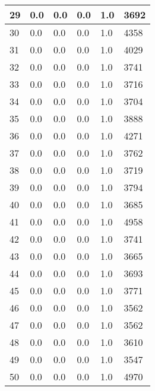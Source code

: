 \begin{longtable}{|l|l|l|l|l|l|}
29 & 0.0 & 0.0 & 0.0 & 1.0 & 3692 \\ \hline 
30 & 0.0 & 0.0 & 0.0 & 1.0 & 4358 \\ \hline 
31 & 0.0 & 0.0 & 0.0 & 1.0 & 4029 \\ \hline 
32 & 0.0 & 0.0 & 0.0 & 1.0 & 3741 \\ \hline 
33 & 0.0 & 0.0 & 0.0 & 1.0 & 3716 \\ \hline 
34 & 0.0 & 0.0 & 0.0 & 1.0 & 3704 \\ \hline 
35 & 0.0 & 0.0 & 0.0 & 1.0 & 3888 \\ \hline 
36 & 0.0 & 0.0 & 0.0 & 1.0 & 4271 \\ \hline 
37 & 0.0 & 0.0 & 0.0 & 1.0 & 3762 \\ \hline 
38 & 0.0 & 0.0 & 0.0 & 1.0 & 3719 \\ \hline 
39 & 0.0 & 0.0 & 0.0 & 1.0 & 3794 \\ \hline 
40 & 0.0 & 0.0 & 0.0 & 1.0 & 3685 \\ \hline 
41 & 0.0 & 0.0 & 0.0 & 1.0 & 4958 \\ \hline 
42 & 0.0 & 0.0 & 0.0 & 1.0 & 3741 \\ \hline 
43 & 0.0 & 0.0 & 0.0 & 1.0 & 3665 \\ \hline 
44 & 0.0 & 0.0 & 0.0 & 1.0 & 3693 \\ \hline 
45 & 0.0 & 0.0 & 0.0 & 1.0 & 3771 \\ \hline 
46 & 0.0 & 0.0 & 0.0 & 1.0 & 3562 \\ \hline 
47 & 0.0 & 0.0 & 0.0 & 1.0 & 3562 \\ \hline 
48 & 0.0 & 0.0 & 0.0 & 1.0 & 3610 \\ \hline 
49 & 0.0 & 0.0 & 0.0 & 1.0 & 3547 \\ \hline 
50 & 0.0 & 0.0 & 0.0 & 1.0 & 4970 \\ \hline 
\end{longtable}